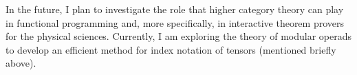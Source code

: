 \documentclass[12pt,letter]{article}
\begin{document}
In the future, I plan to investigate the role that higher category theory can play in functional programming and, more specifically, in interactive theorem provers for the physical sciences. Currently, I am exploring the theory of modular operads to develop an efficient method for index notation of tensors (mentioned briefly above).

\end{document}
